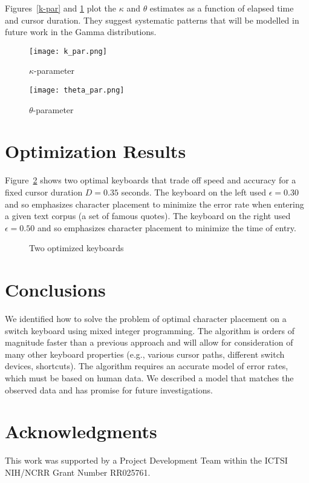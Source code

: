 \documentclass{sig-alternate}
\begin{document}
Figures~\ref{k-par} and \ref{theta-par} plot the $\kappa$ and $\theta$ estimates as a function of elapsed time and cursor duration. They suggest systematic patterns that will be modelled in future work in the Gamma distributions. 

\begin{figure}[htb!]
\begin{minipage}[t]{0.5\linewidth}
\texttt{[image: k\_par.png]}
\caption{$\kappa$-parameter}
\label{k-par}
\end{minipage}\begin{minipage}[t]{0.5\linewidth}
\texttt{[image: theta\_par.png]}
\caption{$\theta$-parameter}
\label{theta-par}
\end{minipage}
\end{figure}

\section{Optimization Results}
Figure~\ref{optr} shows two optimal keyboards that trade off speed and accuracy for a fixed cursor duration $D=0.35$ seconds. The keyboard on the left used $\epsilon=0.30$ and so emphasizes character placement to minimize the error rate when entering a given text corpus (a set of famous quotes). The keyboard on the right used $\epsilon=0.50$ and so emphasizes character placement to minimize the time of entry.
\begin{figure}[htb!]
  \centering
  \hspace{0.05cm}
    \caption{Two optimized keyboards}
	\label{optr}	
\end{figure}

\section{Conclusions}
We identified how to solve the problem of optimal character placement on a switch keyboard using mixed integer programming. The algorithm is orders of magnitude faster than a previous approach and will allow for consideration of many other keyboard properties (e.g., various cursor paths, different switch devices, shortcuts). The algorithm requires an accurate model of error rates, which must be based on human data. We described a model that matches the observed data and has promise for future investigations. 


\section{Acknowledgments}
This work was supported by a Project Development Team within the ICTSI NIH/NCRR Grant Number RR025761.




\end{document}

